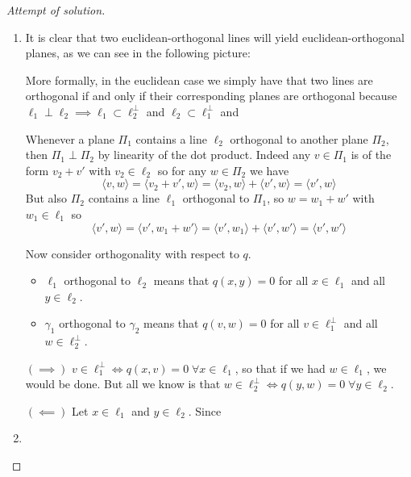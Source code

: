 \documentclass{article}
\begin{document}
\begin{proof}[Attempt of solution]\leavevmode
	\begin{enumerate}[label*=\alph*.]
		\item It is clear that two euclidean-orthogonal lines will yield euclidean-orthogonal planes, as we can see in the following picture:

		More formally, in the euclidean case we simply have that two lines are orthogonal if and only if their corresponding planes are orthogonal because $\ell_1\perp\ell_2\implies\ell_1\subset\ell_2^\perp$ and $\ell_2\subset\ell_1^\perp$ and 
		
		Whenever a plane $\Pi_1$ contains a line $\ell_2$ orthogonal to another plane $\Pi_2$, then $\Pi_1\perp\Pi_2$ by linearity of the dot product. Indeed any $v\in\Pi_1$ is of the form $v_2+v'$ with $v_2\in\ell_2$ so for any $w\in\Pi_2$ we have \[\langle v, w\rangle=\langle v_2+v',w\rangle=\langle v_2,w\rangle+\langle v',w\rangle=\langle v',w\rangle\]
		But also $\Pi_2$ contains a line $\ell_1$ orthogonal to $\Pi_1$, so $w=w_1+w'$ with $w_1\in\ell_1$ so
		\[\langle v',w\rangle=\langle v',w_1+w'\rangle=\langle v',w_1\rangle+\langle v',w'\rangle=\langle v',w'\rangle\]
		
		Now consider orthogonality with respect to $q$. 
		
		\begin{itemize}
			\item $\ell_1$ orthogonal to $\ell_2$ means that $q(x,y)=0$ for all $x\in\ell_1$ and all $y\in\ell_2$.
			\item $\gamma_1$ orthogonal to $\gamma_2$ means that $q(v,w)=0$ for all $v\in\ell_1^\perp$ and all $w\in\ell_2^\perp$.
		\end{itemize}
		$(\implies)$ $v\in\ell^\perp_1\iff q(x,v)=0\;\forall x\in\ell_1$, so that if we had $w\in\ell_1$, we would be done. But all we know is that $w\in\ell^\perp_2\iff q(y,w)=0\;\forall y\in\ell_2$.
		
		$(\impliedby)$ Let $x\in\ell_1$ and $y\in\ell_2$. Since 

		\item 
	\end{enumerate}
\end{proof}\fi
\printbibliography
\end{document}

